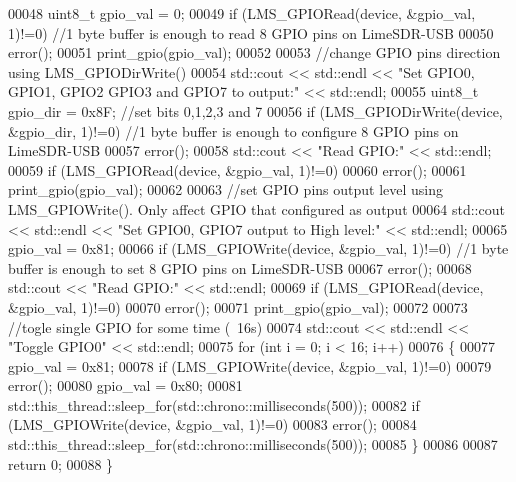 \begin{DoxyCode}
00048     uint8\_t gpio\_val = 0;
00049     \textcolor{keywordflow}{if} (LMS_GPIORead(device, &gpio\_val, 1)!=0) \textcolor{comment}{//1 byte buffer is enough to read 8 GPIO pins on LimeSDR-USB}
00050         error();
00051     print_gpio(gpio\_val);
00052 
00053     \textcolor{comment}{//change GPIO pins direction using LMS\_GPIODirWrite()}
00054     std::cout << std::endl << \textcolor{stringliteral}{"Set GPIO0, GPIO1, GPIO2 GPIO3 and GPIO7 to output:"} << std::endl;
00055     uint8\_t gpio\_dir = 0x8F; \textcolor{comment}{//set bits 0,1,2,3 and 7}
00056     \textcolor{keywordflow}{if} (LMS_GPIODirWrite(device, &gpio\_dir, 1)!=0) \textcolor{comment}{//1 byte buffer is enough to configure 8 GPIO pins on
       LimeSDR-USB}
00057         error();
00058     std::cout << \textcolor{stringliteral}{"Read GPIO:"} << std::endl;
00059     \textcolor{keywordflow}{if} (LMS_GPIORead(device, &gpio\_val, 1)!=0)
00060         error();
00061     print_gpio(gpio\_val);
00062   
00063     \textcolor{comment}{//set GPIO pins output level using LMS\_GPIOWrite(). Only affect GPIO that configured as output}
00064     std::cout << std::endl << \textcolor{stringliteral}{"Set GPIO0, GPIO7 output to High level:"} << std::endl;
00065     gpio\_val = 0x81;
00066     \textcolor{keywordflow}{if} (LMS_GPIOWrite(device, &gpio\_val, 1)!=0) \textcolor{comment}{//1 byte buffer is enough to set 8 GPIO pins on LimeSDR-USB}
00067         error();
00068     std::cout << \textcolor{stringliteral}{"Read GPIO:"} << std::endl;
00069     \textcolor{keywordflow}{if} (LMS_GPIORead(device, &gpio\_val, 1)!=0)
00070         error();
00071     print_gpio(gpio\_val);
00072     
00073     \textcolor{comment}{//togle single GPIO for some time (~16s)}
00074     std::cout << std::endl << \textcolor{stringliteral}{"Toggle GPIO0"} << std::endl;
00075     \textcolor{keywordflow}{for} (\textcolor{keywordtype}{int} i = 0; i < 16; i++)
00076     \{
00077         gpio\_val = 0x81;
00078         \textcolor{keywordflow}{if} (LMS_GPIOWrite(device, &gpio\_val, 1)!=0)
00079             error();
00080         gpio\_val = 0x80;
00081         std::this\_thread::sleep\_for(std::chrono::milliseconds(500));
00082         \textcolor{keywordflow}{if} (LMS_GPIOWrite(device, &gpio\_val, 1)!=0)
00083             error();  
00084         std::this\_thread::sleep\_for(std::chrono::milliseconds(500));      
00085     \}
00086        
00087     \textcolor{keywordflow}{return} 0;
00088 \}
\end{DoxyCode}
